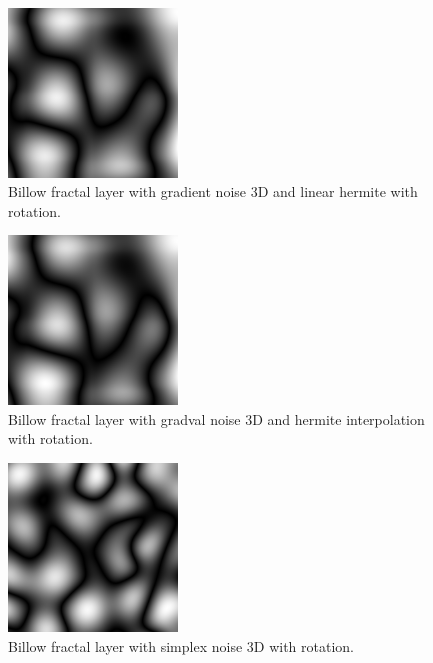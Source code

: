 \begin{figure}[h]
\centering
\includegraphics[width=0.4\textwidth]{out/simpleBillowLayer3/simpleBillowLayer3_gradient_noise3D_hermiteInterp_rot.png}
\caption{Billow fractal layer with gradient noise 3D and linear hermite with rotation.}
\label{fig:billow_fractal_layer3_gradient_noise3D_hermiteInterp_rot}
\end{figure}

\begin{figure}[h]
\centering
\includegraphics[width=0.4\textwidth]{out/simpleBillowLayer3/simpleBillowLayer3_gradval_noise3D_hermiteInterp_rot.png}
\caption{Billow fractal layer with gradval noise 3D and hermite interpolation with rotation.}
\label{fig:billow_fractal_layer3_gradval_noise3D_hermiteInterp_rot}
\end{figure}

\begin{figure}[h]
\centering
\includegraphics[width=0.4\textwidth]{out/simpleBillowLayer3/simpleBillowLayer3_simplex_noise3D_noInterp_rot.png}
\caption{Billow fractal layer with simplex noise 3D with rotation.}
\label{fig:billow_fractal_layer3_simplex_noise3D_noInterp_rot}
\end{figure}

